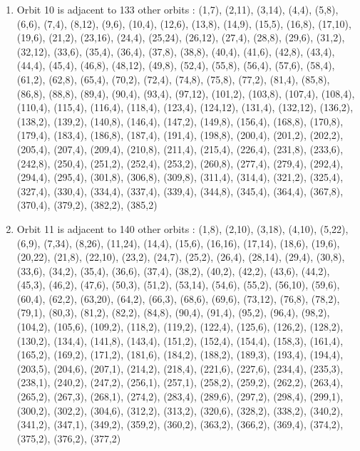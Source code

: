 \documentclass[12pt]{article}
\begin{document}
\begin{enumerate}
\item Orbit 10 is adjacent to 133 other orbits : (1,7), (2,11), (3,14), (4,4), (5,8), (6,6), (7,4), (8,12), (9,6), (10,4), (12,6), (13,8), (14,9), (15,5), (16,8), (17,10), (19,6), (21,2), (23,16), (24,4), (25,24), (26,12), (27,4), (28,8), (29,6), (31,2), (32,12), (33,6), (35,4), (36,4), (37,8), (38,8), (40,4), (41,6), (42,8), (43,4), (44,4), (45,4), (46,8), (48,12), (49,8), (52,4), (55,8), (56,4), (57,6), (58,4), (61,2), (62,8), (65,4), (70,2), (72,4), (74,8), (75,8), (77,2), (81,4), (85,8), (86,8), (88,8), (89,4), (90,4), (93,4), (97,12), (101,2), (103,8), (107,4), (108,4), (110,4), (115,4), (116,4), (118,4), (123,4), (124,12), (131,4), (132,12), (136,2), (138,2), (139,2), (140,8), (146,4), (147,2), (149,8), (156,4), (168,8), (170,8), (179,4), (183,4), (186,8), (187,4), (191,4), (198,8), (200,4), (201,2), (202,2), (205,4), (207,4), (209,4), (210,8), (211,4), (215,4), (226,4), (231,8), (233,6), (242,8), (250,4), (251,2), (252,4), (253,2), (260,8), (277,4), (279,4), (292,4), (294,4), (295,4), (301,8), (306,8), (309,8), (311,4), (314,4), (321,2), (325,4), (327,4), (330,4), (334,4), (337,4), (339,4), (344,8), (345,4), (364,4), (367,8), (370,4), (379,2), (382,2), (385,2)
\item Orbit 11 is adjacent to 140 other orbits : (1,8), (2,10), (3,18), (4,10), (5,22), (6,9), (7,34), (8,26), (11,24), (14,4), (15,6), (16,16), (17,14), (18,6), (19,6), (20,22), (21,8), (22,10), (23,2), (24,7), (25,2), (26,4), (28,14), (29,4), (30,8), (33,6), (34,2), (35,4), (36,6), (37,4), (38,2), (40,2), (42,2), (43,6), (44,2), (45,3), (46,2), (47,6), (50,3), (51,2), (53,14), (54,6), (55,2), (56,10), (59,6), (60,4), (62,2), (63,20), (64,2), (66,3), (68,6), (69,6), (73,12), (76,8), (78,2), (79,1), (80,3), (81,2), (82,2), (84,8), (90,4), (91,4), (95,2), (96,4), (98,2), (104,2), (105,6), (109,2), (118,2), (119,2), (122,4), (125,6), (126,2), (128,2), (130,2), (134,4), (141,8), (143,4), (151,2), (152,4), (154,4), (158,3), (161,4), (165,2), (169,2), (171,2), (181,6), (184,2), (188,2), (189,3), (193,4), (194,4), (203,5), (204,6), (207,1), (214,2), (218,4), (221,6), (227,6), (234,4), (235,3), (238,1), (240,2), (247,2), (256,1), (257,1), (258,2), (259,2), (262,2), (263,4), (265,2), (267,3), (268,1), (274,2), (283,4), (289,6), (297,2), (298,4), (299,1), (300,2), (302,2), (304,6), (312,2), (313,2), (320,6), (328,2), (338,2), (340,2), (341,2), (347,1), (349,2), (359,2), (360,2), (363,2), (366,2), (369,4), (374,2), (375,2), (376,2), (377,2)

\end{enumerate}
\end{document}
